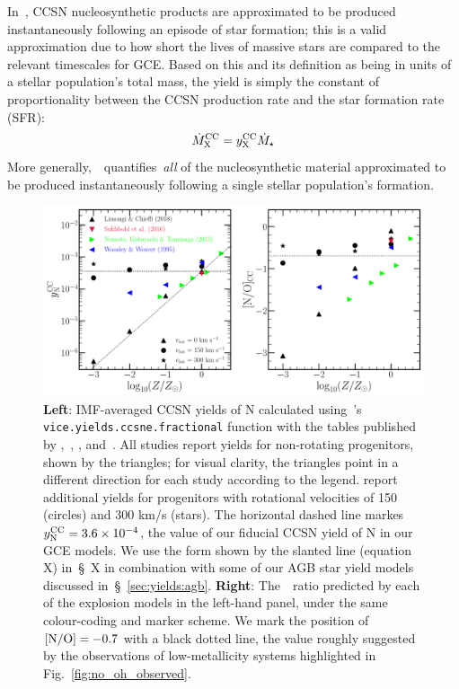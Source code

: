 \documentclass[ms.tex]{subfiles}
\begin{document}
In~\vice, CCSN nucleosynthetic products are approximated to be produced
instantaneously following an episode of star formation; this is a valid
approximation due to how short the lives of massive stars are compared to the
relevant timescales for GCE.
Based on this and its definition as being in units of a stellar population's
total mass, the yield is simply the constant of proportionality between the
CCSN production rate and the star formation rate (SFR):
\begin{equation}
\dot{M}_\text{X}^\text{CC} = y_\text{X}^\text{CC}\dot{M}_\star
\end{equation}
More generally,~~quantifies~\textit{all} of the nucleosynthetic material
approximated to be produced instantaneously following a single stellar
population's formation.

\begin{figure}
\centering
\includegraphics[scale = 0.45]{n_cc_yields.pdf}
\caption{
\textbf{Left}: IMF-averaged CCSN yields of N calculated using~\vice's
\texttt{vice.yields.ccsne.fractional} function with the tables published by
\citet[][blue]{Woosley1995},~\citet[][green]{Nomoto2013},
\citet[][red]{Sukhbold2016}, and~\citet[][black]{Limongi2018}.
All studies report yields for non-rotating progenitors, shown by the triangles;
for visual clarity, the triangles point in a different direction for each study
according to the legend.
\citet{Limongi2018} report additional yields for progenitors with rotational
velocities of 150 (circles) and 300 km/s (stars).
The horizontal dashed line markes~$y_\text{N}^\text{CC} = 3.6\times10^{-4}$,
the value of our fiducial CCSN yield of N in our GCE models.
We use the form shown by the slanted line (equation X) in~\S~X in combination
with some of our AGB star yield models discussed in~\S~\ref{sec:yields:agb}.
\textbf{Right}: The~\no~ratio predicted by each of the explosion models in
the left-hand panel, under the same colour-coding and marker scheme.
We mark the position of~$\text{[N/O]} = -0.7$ with a black dotted line, the value
roughly suggested by the observations of low-metallicity systems highlighted
in Fig.~\ref{fig:no_oh_observed}.
}
\label{fig:n_cc_yields}
\end{figure}
\end{document}
